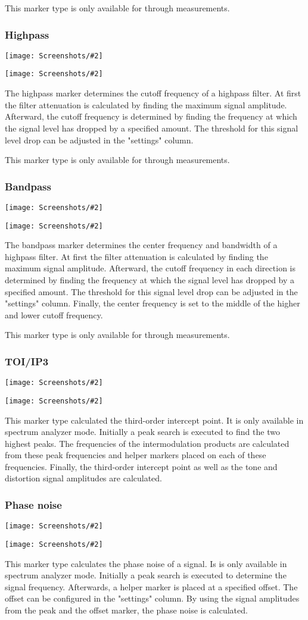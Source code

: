 \documentclass[a4paper,11pt]{article}
\newcommand{\screenshot}[2]{\begin{center}
\texttt{[image: Screenshots/\#2]}
\end{center}}
\begin{document}
This marker type is only available for through measurements.
\subsubsection{Highpass}
\screenshot{1.0}{MarkerHighpassGraph.png}
\screenshot{1.0}{MarkerHighpassTable.png}
The highpass marker determines the cutoff frequency of a highpass filter. At first the filter attenuation is calculated by finding the maximum signal amplitude. Afterward, the cutoff frequency is determined by finding the frequency at which the signal level has dropped by a specified amount. The threshold for this signal level drop can be adjusted in the "settings" column.

This marker type is only available for through measurements.
\subsubsection{Bandpass}
\screenshot{1.0}{MarkerBandpassGraph.png}
\screenshot{1.0}{MarkerBandpassTable.png}
The bandpass marker determines the center frequency and bandwidth of a highpass filter. At first the filter attenuation is calculated by finding the maximum signal amplitude. Afterward, the cutoff frequency in each direction is determined by finding the frequency at which the signal level has dropped by a specified amount. The threshold for this signal level drop can be adjusted in the "settings" column. Finally, the center frequency is set to the middle of the higher and lower cutoff frequency.

This marker type is only available for through measurements.
\subsubsection{TOI/IP3}
\screenshot{1.0}{MarkerTOIGraph.png}
\screenshot{1.0}{MarkerTOITable.png}
This marker type calculated the third-order intercept point. It is only available in spectrum analyzer mode. Initially a peak search is executed to find the two highest peaks. The frequencies of the intermodulation products are calculated from these peak frequencies and helper markers placed on each of these frequencies. Finally, the third-order intercept point as well as the tone and distortion signal amplitudes are calculated.
\subsubsection{Phase noise}
\screenshot{1.0}{MarkerPhasenoiseGraph.png}
\screenshot{1.0}{MarkerPhasenoiseTable.png}
This marker type calculates the phase noise of a signal. Is is only available in spectrum analyzer mode. Initially a peak search is executed to determine the signal frequency. Afterwards, a helper marker is placed at a specified offset. The offset can be configured in the "settings" column. By using the signal amplitudes from the peak and the offset marker, the phase noise is calculated.
\end{document}
